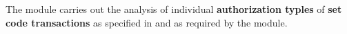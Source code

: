 The \rlpAuthMod{} module carries out the analysis of individual
\textbf{authorization typles} of \textbf{set code transactions}
as specified in \cite{EIP-7702}
and as required by the \rlpTxnMod{} module.
